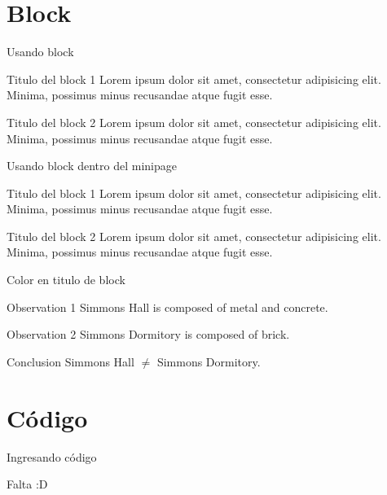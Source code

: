 \documentclass[10pt]{beamer}%
\begin{document}
\section{Block} %
\begin{frame}{Usando block}
	\begin{block}{Titulo del block 1}
			Lorem ipsum dolor sit amet, consectetur adipisicing elit. Minima, possimus minus recusandae atque fugit esse.
	\end{block}
	\begin{block}{Titulo del block 2}
			Lorem ipsum dolor sit amet, consectetur adipisicing elit. Minima, possimus minus recusandae atque fugit esse.
	\end{block}
\end{frame}
\begin{frame}{Usando block dentro del minipage}
	\begin{minipage}{0.49\textwidth}
	\begin{block}{Titulo del block 1}
			Lorem ipsum dolor sit amet, consectetur adipisicing elit. Minima, possimus minus recusandae atque fugit esse.
	\end{block}
	\end{minipage}
	\hfil
	\begin{minipage}{0.49\textwidth}
	\begin{block}{Titulo del block 2}
			Lorem ipsum dolor sit amet, consectetur adipisicing elit. Minima, possimus minus recusandae atque fugit esse.
	\end{block}
	\end{minipage}
\end{frame}
\begin{frame}{Color en titulo de block}
\begin{block}{Observation 1}
Simmons Hall is composed of metal and concrete.
\end{block}
\begin{exampleblock}{Observation 2}
Simmons Dormitory is composed of brick.
\end{exampleblock}
\begin{alertblock}{Conclusion}
Simmons Hall $\not=$ Simmons Dormitory.
\end{alertblock}
\end{frame}
\section{Código}
\begin{frame}{Ingresando código}
	\begin{center}
		{\Huge Falta :D}
	\end{center}
\end{frame}
{\aauwavesbg%
\begin{frame}%
\end{frame}}
\end{document}
